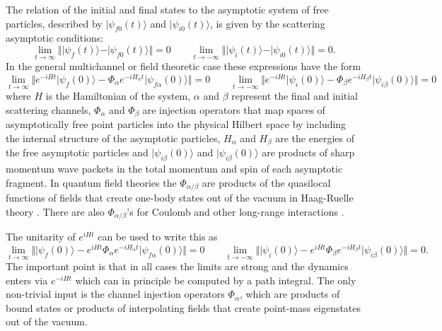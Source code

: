 \documentclass[aps,prc,reprint,noshowpacs,groupedaddress,onecolumn]{revtex4}
\def\beq{\begin{equation}}
\def\eeq{\end{equation}}
\begin{document}
The relation of the initial and final states to the asymptotic system
of free particles, described by $\vert \psi_{f0}(t) \rangle$ and
$\vert \psi_{i0}(t) \rangle$, is given by the scattering asymptotic
conditions:
\beq
\lim_{t \to \infty} \Vert \vert \psi_f(t) \rangle - \vert \psi_{f0}(t)
\rangle \Vert =0 
\qquad
\lim_{t \to -\infty} \Vert \vert \psi_i(t) \rangle - \vert \psi_{i0}(t)
\rangle \Vert =0 .
\label{s.2}
\eeq
In the general multichannel or field theoretic case these expressions
have the form
\beq
\lim_{t \to \infty} \Vert e^{-iHt} \vert \psi_f(0) \rangle - 
\Phi_\alpha e^{-iH_\alpha t}\vert \psi_{f\alpha }(0)
\rangle \Vert =0 
\qquad
\lim_{t \to -\infty} \Vert e^{-iH t} \vert \psi_i(0) \rangle - 
\Phi_\beta e^{-iH_\beta t}\vert \psi_{i\beta}(0)
\rangle \Vert =0 
\label{s.3a}
\eeq
where $H$ is the Hamiltonian of the system, $\alpha$ and $\beta$
represent the final and initial scattering channels, $\Phi_{\alpha}$
and $\Phi_{\beta}$ are injection operators that map spaces of
asymptotically free point particles into the physical Hilbert space by
including the internal structure of the asymptotic particles,
$H_\alpha$ and $H_\beta$ are the energies of the free asymptotic
particles and $\vert \psi_{i\beta}(0)\rangle$ and
$\vert \psi_{i\beta}(0)\rangle $ are products of sharp momentum wave
packets in the total momentum and spin of each asymptotic fragment.
In quantum field theories the $\Phi_{\alpha/ \beta}$ are products of
the quasilocal functions of fields that create one-body states out of
the vacuum in Haag-Ruelle theory \cite{Haag:1958vt}\cite{Ruelle:1962}.
There are also $\Phi_{\alpha/ \beta}$'s for Coulomb and other
long-range interactions \cite{Dollard} \cite{dollard:1978we}.

The unitarity of $e^{iHt}$ can be
used to write this as
\beq
\lim_{t \to \infty} \Vert\vert \psi_f(0) \rangle - 
e^{iHt}\Phi_\alpha e^{-iH_\alpha t}\vert \psi_{f\alpha }(0)
\rangle \Vert =0 
\qquad
\lim_{t \to -\infty} \Vert \vert \psi_i(0) \rangle - 
e^{iHt} \Phi_\beta e^{-iH_\beta t}\vert \psi_{i\beta}(0)
\rangle \Vert =0 .
\label{s.3b}
\eeq
The important point is that in all cases the limits are strong and the
dynamics enters via $e^{-iHt}$ which can in principle be computed by a
path integral.  The only non-trivial input is the channel injection
operators $\Phi_\alpha$, which are products of bound states or
products of interpolating fields that create point-mass eigenstates
out of the vacuum.
\end{document}
